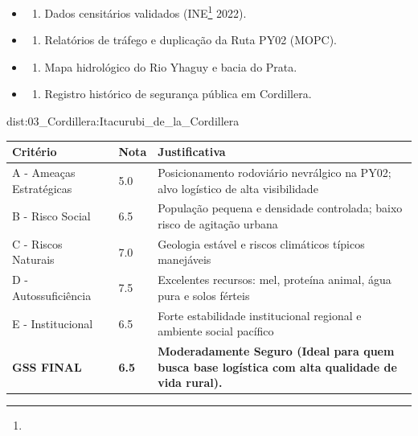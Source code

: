 {\begin{itemize}
\tightlist
\item
  \begin{enumerate}
  \def\labelenumi{\arabic{enumi})}
  \tightlist
  \item
    Dados censitários validados (INE\footnote{\fineINE} 2022).
  \end{enumerate}
\item
  \begin{enumerate}
  \def\labelenumi{\arabic{enumi})}
  \setcounter{enumi}{1}
  \tightlist
  \item
    Relatórios de tráfego e duplicação da Ruta PY02 (MOPC).
  \end{enumerate}
\item
  \begin{enumerate}
  \def\labelenumi{\arabic{enumi})}
  \setcounter{enumi}{2}
  \tightlist
  \item
    Mapa hidrológico do Rio Yhaguy e bacia do Prata.
  \end{enumerate}
\item
  \begin{enumerate}
  \def\labelenumi{\arabic{enumi})}
  \setcounter{enumi}{3}
  \tightlist
  \item
    Registro histórico de segurança pública em Cordillera.
  \end{enumerate}
\end{itemize}}{dist:03_Cordillera:Itacurubi_de_la_Cordillera}
\begin{table}[ht!]
\small \begin{tabular}{p{3.0cm}p{0.8cm}p{6.0cm}} \toprule
\textbf{Critério} & \textbf{Nota} & \textbf{Justificativa} \\ \midrule
A - Ameaças Estratégicas & 5.0 & Posicionamento rodoviário nevrálgico na PY02; alvo logístico de alta visibilidade \\
B - Risco Social & 6.5 & População pequena e densidade controlada; baixo risco de agitação urbana \\
C - Riscos Naturais & 7.0 & Geologia estável e riscos climáticos típicos manejáveis \\
D - Autossuficiência & 7.5 & Excelentes recursos: mel, proteína animal, água pura e solos férteis \\
E - Institucional & 6.5 & Forte estabilidade institucional regional e ambiente social pacífico \\
\midrule \textbf{GSS FINAL} & \textbf{6.5} & \textbf{Moderadamente Seguro (Ideal para quem busca base logística com alta qualidade de vida rural).} \\ \bottomrule \end{tabular}
\end{table}
